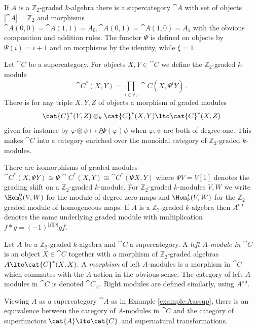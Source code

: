 \begin{example}\label{example:Aassup} If $A$ is a $\mathbb{Z}_2$-graded $k$-algebra there is a supercategory $\cat{A}$ with set of objects $|\cat{A}| = \mathbb{Z}_2$ and morphisms $\cat{A}(0,0) = \cat{A}(1,1) = A_0, \cat{A}(0,1) = \cat{A}(1,0) = A_1$ with the obvious composition and addition rules. The functor $\Psi$ is defined on objects by $\Psi(i) = i+1$ and on morphisms by the identity, while $\xi = 1$.
\end{example}

Let $\cat{C}$ be a supercategory. For objects $X,Y \in \cat{C}$ we define the $\mathbb{Z}_2$-graded $k$-module
\[
\cat{C}^*(X,Y) = \prod_{i \in \mathbb{Z}_2} \cat{C}(X, \Psi^i Y)\,.
\]
There is for any triple $X,Y,Z$ of objects a morphism of graded modules
\[
\cat{C}^*(Y,Z) \otimes_k \cat{C}^*(X, Y) \lto \cat{C}^*(X,Z)
\]
given for instance by $\varphi \otimes \psi \mapsto \xi \Psi( \varphi ) \psi$ when $\varphi, \psi$ are both of degree one. This makes $\cat{C}$ into a category enriched over the monoidal category of $\mathbb{Z}_2$-graded $k$-modules.

There are isomorphisms of graded modules $\cat{C}^*(X, \Psi Y) \cong \Psi \cat{C}^*(X, Y) \cong \cat{C}^*(\Psi X, Y)$ where $\Psi V = V [1]$ denotes the grading shift on a $\mathbb{Z}_2$-graded $k$-module. For $\mathbb{Z}_2$-graded $k$-modules $V,W$ we write $\Hom^0_k(V, W)$ for the module of degree zero maps and $\Hom_k^*(V, W)$ for the $\mathbb{Z}_2$-graded module of homogeneous maps. If $A$ is a $\mathbb{Z}_2$-graded $k$-algebra then $A^{\operatorname{op}}$ denotes the same underlying graded module with multiplication $f * g = (-1)^{|f||g|} gf$.

\begin{definition} Let $A$ be a $\mathbb{Z}_2$-graded $k$-algebra and $\cat{C}$ a supercategory. A \emph{left $A$-module in $\cat{C}$} is an object $X \in \cat{C}$ together with a morphism of $\mathbb{Z}_2$-graded algebras $A \lto \cat{C}^*(X,X)$. A \emph{morphism} of left $A$-modules is a morphism in $\cat{C}$ which commutes with the $A$-action in the obvious sense. The category of left $A$-modules in $\cat{C}$ is denoted $\cat{C}_A$. Right modules are defined similarly, using $A^{\operatorname{op}}$.
\end{definition}

\begin{remark}\label{remark:supercat_idempcomp} Viewing $A$ as a supercategory $\cat{A}$ as in Example \ref{example:Aassup}, there is an equivalence between the category of $A$-modules in $\cat{C}$ and the category of superfunctors $\cat{A} \lto \cat{C}$ and supernatural transformations.
\end{remark}

